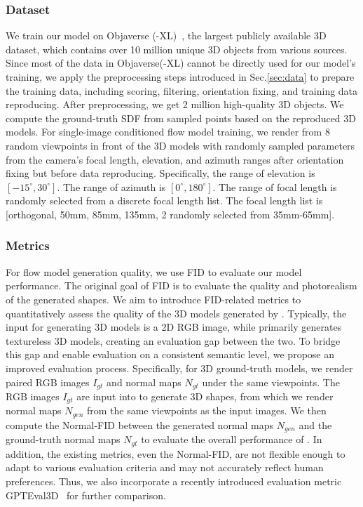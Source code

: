 \subsubsection{Dataset}
We train our model on Objaverse (-XL)~\cite{deitke2023objaverse,deitke2024objaverse}, the largest publicly available 3D dataset, which contains over 10 million unique 3D objects from various sources.
Since most of the data in Objaverse(-XL) cannot be directly used for our model's training, we apply the preprocessing steps introduced in Sec.\ref{sec:data} to prepare the training data, including scoring, filtering, orientation fixing, and training data reproducing.
After preprocessing, we get 2 million high-quality 3D objects. We compute the ground-truth SDF from sampled points based on the reproduced 3D models.
For single-image conditioned flow model training, we render from 8 random viewpoints in front of the 3D models with randomly sampled parameters from the camera's focal length, elevation, and azimuth ranges after orientation fixing but before data reproducing. Specifically, the range of elevation is $[-15^\circ, 30^\circ]$. 
The range of azimuth is $[0^\circ, 180^\circ]$.
The range of focal length is randomly selected from a discrete focal length list. The focal length list is [orthogonal, 50mm, 85mm, 135mm, 2 randomly selected from 35mm-65mm].
 


\subsubsection{Metrics}\label{sec:metric}
For flow model generation quality, we use FID\cite{heusel2017gans} to evaluate our model performance.
The original goal of FID is to evaluate the quality and photorealism of the generated shapes. We aim to introduce FID-related metrics to quantitatively assess the quality of the 3D models generated by \method{}. Typically, the input for generating 3D models is a 2D RGB image, while \method{} primarily generates textureless 3D models, creating an evaluation gap between the two.
To bridge this gap and enable evaluation on a consistent semantic level, we propose an improved evaluation process. Specifically, for 3D ground-truth models, we render paired RGB images $I_{gt}$ and normal maps $N_{gt}$ under the same viewpoints. The RGB images $I_{gt}$ are input into \method{} to generate 3D shapes, from which we render normal maps $N_{gen}$ from the same viewpoints as the input images. We then compute the Normal-FID between the generated normal maps $N_{gen}$ and the ground-truth normal maps $N_{gt}$ to evaluate the overall performance of \method{}.
In addition, the existing metrics, even the Normal-FID, are not flexible enough to adapt to various evaluation criteria and may not accurately reflect human preferences.
Thus, we also incorporate a recently introduced evaluation metric GPTEval3D~\cite{DBLP:conf/cvpr/WuYLZLGLW24} for further comparison.

